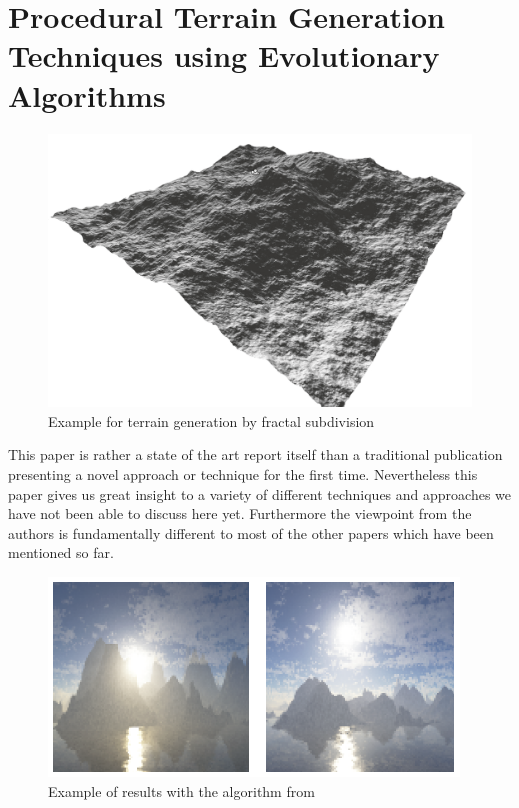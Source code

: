 \section{Procedural Terrain Generation Techniques using Evolutionary Algorithms}

\begin{figure}[htb]
	\centering
	\includegraphics[width=\linewidth]{RZL12/06256610_1.png}
	\caption{Example for terrain generation by fractal subdivision}
	\label{fig:frag_subdev}
\end{figure}

This paper \cite{raffe2012survey} is rather a state of the art report itself than a traditional publication presenting a novel approach or technique for the first time. Nevertheless this paper gives us great insight to a variety of different techniques and approaches we have not been able to discuss here yet. Furthermore the viewpoint from the authors is fundamentally different to most of the other papers which have been mentioned so far.

\begin{figure}[htb]
	\centering
	\includegraphics[width=\linewidth]{RZL12/5zr45zr6z5.png}
	\caption{Example of results with the algorithm from \cite{walsh2011use}}
	\label{fig:tag17}
\end{figure}

